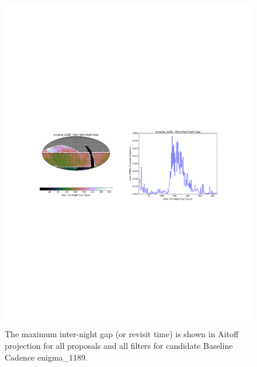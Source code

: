 \documentclass[manuscript]{article}
\begin{document}
\begin{figure}[b!]
\vskip -3.8in
\hskip -0.5in
\includegraphics[angle=0,width=1.19\hsize,clip]{enigma1189_MAXinterGapAll.pdf}
\vskip -4.0in
\caption{The maximum inter-night gap (or revisit time) is shown in Aitoff projection 
for all proposals and all filters for candidate Baseline Cadence enigma\_1189.} 
\label{fig:enigmaMAXGapAll}
\end{figure}
\end{document}
